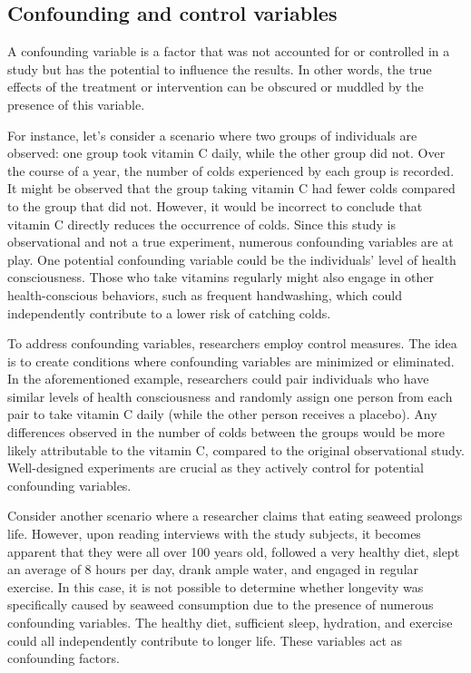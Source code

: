\documentclass[
  12pt,
  oneside]{book}
\theoremstyle{definition}
\theoremstyle{definition}
\theoremstyle{definition}
\theoremstyle{definition}
\theoremstyle{remark}
\begin{document}
\hypertarget{confounding-and-control-variables}{%
\subsection{Confounding and control variables}\label{confounding-and-control-variables}}

A confounding variable is a factor that was not accounted for or controlled in a study but has the potential to influence the results. In other words, the true effects of the treatment or intervention can be obscured or muddled by the presence of this variable.

For instance, let's consider a scenario where two groups of individuals are observed: one group took vitamin C daily, while the other group did not. Over the course of a year, the number of colds experienced by each group is recorded. It might be observed that the group taking vitamin C had fewer colds compared to the group that did not. However, it would be incorrect to conclude that vitamin C directly reduces the occurrence of colds. Since this study is observational and not a true experiment, numerous confounding variables are at play. One potential confounding variable could be the individuals' level of health consciousness. Those who take vitamins regularly might also engage in other health-conscious behaviors, such as frequent handwashing, which could independently contribute to a lower risk of catching colds.

To address confounding variables, researchers employ control measures. The idea is to create conditions where confounding variables are minimized or eliminated. In the aforementioned example, researchers could pair individuals who have similar levels of health consciousness and randomly assign one person from each pair to take vitamin C daily (while the other person receives a placebo). Any differences observed in the number of colds between the groups would be more likely attributable to the vitamin C, compared to the original observational study. Well-designed experiments are crucial as they actively control for potential confounding variables.

Consider another scenario where a researcher claims that eating seaweed prolongs life. However, upon reading interviews with the study subjects, it becomes apparent that they were all over 100 years old, followed a very healthy diet, slept an average of 8 hours per day, drank ample water, and engaged in regular exercise. In this case, it is not possible to determine whether longevity was specifically caused by seaweed consumption due to the presence of numerous confounding variables. The healthy diet, sufficient sleep, hydration, and exercise could all independently contribute to longer life. These variables act as confounding factors.
\end{document}
